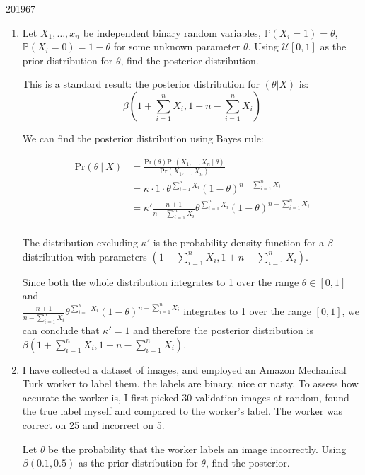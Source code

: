 \documentclass[10pt,\jkfside,a4paper]{article}
\begin{document}
\begin{examquestion}{2019}{6}{7}

\begin{enumerate}[label=(\alph*)]

\item Let $X_1, \dots, x_n$ be independent binary random variables,
$\mathbb{P}(X_i = 1) = \theta$, $\mathbb{P}(X_i = 0) = 1 - \theta$ for some
unknown parameter $\theta$. Using $\mathcal{U}[0, 1]$ as the prior
distribution for $\theta$, find the posterior distribution.

This is a standard result: the posterior distribution for $(\theta | X)$ is:
\[
\beta\left( 1 + \sum^n_{i=1}X_i, 1 + n - \sum^n_{i=1}X_i \right)
\]

We can find the posterior distribution using Bayes rule:

\[
\begin{split}
\text{Pr}(\theta \ | \ X)
&= \frac{\text{Pr}(\theta)\text{Pr}(X_1, \dots, X_n \ | \ \theta)}{\text{Pr}
(X_1, \dots, X_n)} \\
&= \kappa \cdot 1 \cdot \theta^{\sum^n_{i=1}X_i}(1 - \theta)^{n -
\sum^n_{i=1}X_i} \\
&= \kappa' \frac{n + 1}{n - \sum^n_{i=1}X_i} \theta^{\sum^n_{i=1}X_i}(1 - \theta)^{n -
\sum^n_{i=1}X_i}\\
\end{split}
\]

The distribution excluding $\kappa'$ is the probability density function for
a $\beta$ distribution with parameters $\left( 1 + \sum^n_{i=1}X_i, 1 + n -
\sum^n_{i=1}X_i \right)$.

Since both the whole distribution integrates to 1 over the range $\theta \in
[0, 1]$ and \\ $\frac{n + 1}{n - \sum^n_{i=1}X_i} \theta^{\sum^n_{i=1}X_i}(1 - \theta)^{n -
\sum^n_{i=1}X_i}$ integrates to 1 over the range $[0, 1]$, we can conclude
that $\kappa' = 1$ and therefore the posterior distribution is $\beta\left(
1 + \sum^n_{i=1}X_i, 1 + n - \sum^n_{i=1}X_i \right)$.

\item I have collected a dataset of images, and employed an Amazon
Mechanical Turk worker to label them. the labels are binary, nice
or nasty. To assess how accurate the worker is, I first picked 30
validation images at random, found the true label myself and compared to the
worker's label. The worker was correct on 25 and incorrect on 5.

Let $\theta$ be the probability that the worker labels an image incorrectly.
Using $\beta(0.1, 0.5)$ as the prior distribution for $\theta$, find the
posterior.


\end{enumerate}
\end{examquestion}
\end{document}
